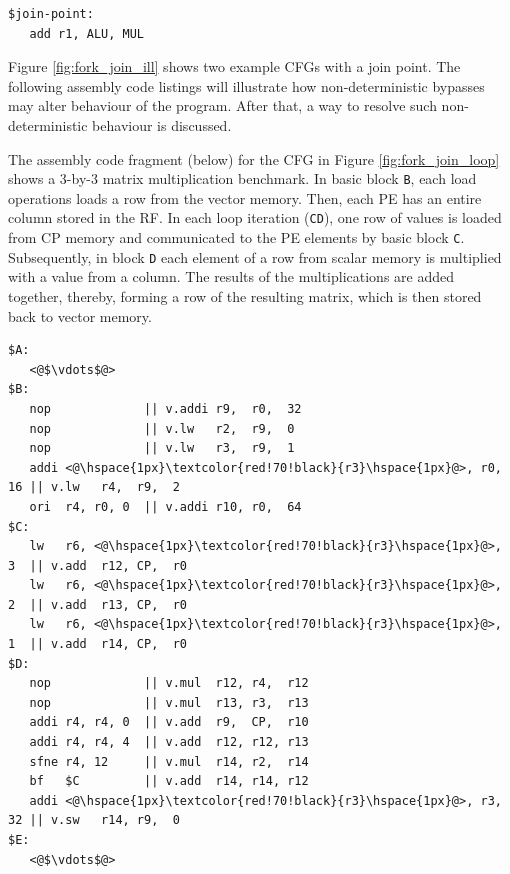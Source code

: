 \begin{lstlisting}
$join-point:
   add r1, ALU, MUL
\end{lstlisting}

Figure \ref{fig:fork_join_ill} shows two example CFGs with a join point. The following assembly code listings will illustrate how non-deterministic bypasses may alter behaviour of the program. After that, a way to resolve such non-deterministic behaviour is discussed.

The assembly code fragment (below) for the CFG in Figure \ref{fig:fork_join_loop} shows a 3-by-3 matrix multiplication benchmark. In basic block \texttt{B}, each load operations loads a row from the vector memory. Then, each PE has an entire column stored in the RF. In each loop iteration (\texttt{CD}), one row of values is loaded from CP memory and communicated to the PE elements by basic block \texttt{C}. Subsequently, in block \texttt{D} each element of a row from scalar memory is multiplied with a value from a column. The results of the multiplications are added together, thereby, forming a row of the resulting matrix, which is then stored back to vector memory. 

\begin{lstlisting}
$A:
   <@$\vdots$@>
$B:
   nop             || v.addi r9,  r0,  32
   nop             || v.lw   r2,  r9,  0
   nop             || v.lw   r3,  r9,  1
   addi <@\hspace{1px}\textcolor{red!70!black}{r3}\hspace{1px}@>, r0, 16 || v.lw   r4,  r9,  2
   ori  r4, r0, 0  || v.addi r10, r0,  64
$C:
   lw   r6, <@\hspace{1px}\textcolor{red!70!black}{r3}\hspace{1px}@>, 3  || v.add  r12, CP,  r0
   lw   r6, <@\hspace{1px}\textcolor{red!70!black}{r3}\hspace{1px}@>, 2  || v.add  r13, CP,  r0
   lw   r6, <@\hspace{1px}\textcolor{red!70!black}{r3}\hspace{1px}@>, 1  || v.add  r14, CP,  r0
$D:
   nop             || v.mul  r12, r4,  r12
   nop             || v.mul  r13, r3,  r13
   addi r4, r4, 0  || v.add  r9,  CP,  r10
   addi r4, r4, 4  || v.add  r12, r12, r13
   sfne r4, 12     || v.mul  r14, r2,  r14
   bf   $C         || v.add  r14, r14, r12
   addi <@\hspace{1px}\textcolor{red!70!black}{r3}\hspace{1px}@>, r3, 32 || v.sw   r14, r9,  0
$E:
   <@$\vdots$@>
\end{lstlisting}

